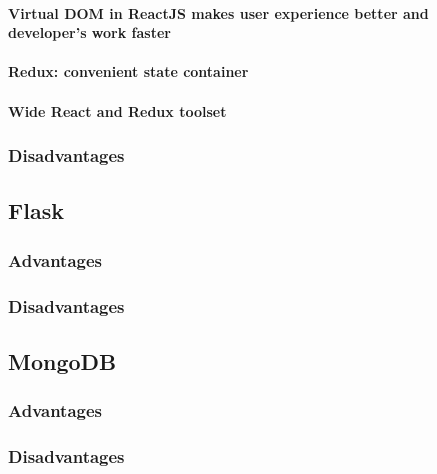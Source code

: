 \paragraph{Virtual DOM in ReactJS makes user experience better and developer’s work faster}

\paragraph{Redux: convenient state container}

\paragraph{Wide React and Redux toolset}

\subsubsection{Disadvantages}


\subsection{Flask}

\subsubsection{Advantages}

\subsubsection{Disadvantages}


\subsection{MongoDB}

\subsubsection{Advantages}

\subsubsection{Disadvantages}

